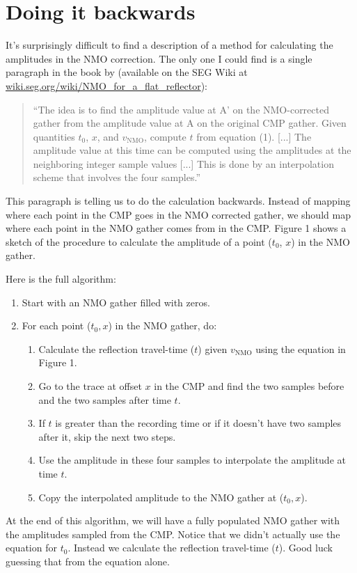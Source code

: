 \section{Doing it backwards}

It's surprisingly difficult to find a description of a method for calculating
the amplitudes in the NMO correction.
The only one I could find is a single paragraph in the book by
\citet{Yilmaz_2001} (available on the SEG Wiki at
\href{http://wiki.seg.org/wiki/NMO_for_a_flat_reflector}{wiki.seg.org/wiki/NMO\_for\_a\_flat\_reflector}):

\begin{quotation}
``The idea is to find the amplitude value at A' on the NMO-corrected gather
from the amplitude value at A on the original CMP gather. Given quantities
$t_0$, $x$, and $v_\mathrm{NMO}$, compute $t$ from equation (1). [...] The
amplitude value at this time can be computed using the amplitudes at the
neighboring integer sample values [...] This is done by an interpolation scheme
that involves the four samples.''
\end{quotation}

This paragraph is telling us to do the calculation backwards.
Instead of mapping where each point in the CMP goes in the NMO corrected
gather, we should map where each point in the NMO gather comes from in the CMP.
Figure 1 shows a sketch of the procedure to calculate the amplitude of a point
($t_0$, $x$) in the NMO gather.

Here is the full algorithm:

\begin{enumerate}
    \item Start with an NMO gather filled with zeros.
    \item For each point ($t_0, x$) in the NMO gather, do:
    \begin{enumerate}
        \item Calculate the reflection travel-time ($t$) given $v_\mathrm{NMO}$ using
              the equation in Figure 1.
        \item Go to the trace at offset $x$ in the CMP and find the two samples
              before and the two samples after time $t$.
        \item If $t$ is greater than the recording time or if it doesn't have
              two samples after it, skip the next two steps.
        \item Use the amplitude in these four samples to interpolate the
              amplitude at time $t$.
        \item Copy the interpolated amplitude to the NMO gather at ($t_0, x$).
    \end{enumerate}
\end{enumerate}

At the end of this algorithm, we will have a fully populated NMO gather with
the amplitudes sampled from the CMP.
Notice that we didn't actually use the equation for $t_0$.
Instead we calculate the reflection travel-time ($t$).
Good luck guessing that from the equation alone.
